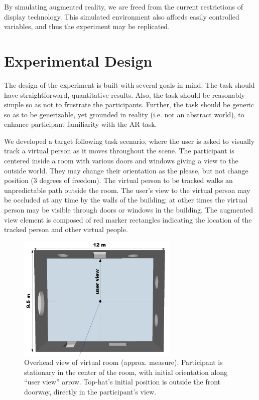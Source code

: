 \documentclass{acmsiggraph}                     %
\begin{document}
By simulating augmented reality, we are freed from the current restrictions of display technology.  This simulated environment also affords easily controlled variables, and thus the experiment may be replicated.

\section{Experimental Design}

The design of the experiment is built with several goals in mind.  The task should have straightforward, quantitative results.  Also, the task should be reasonably simple so as not to frustrate the participants.  Further, the task should be generic so as to be generizable, yet grounded in reality (i.e. not an abstract world), to enhance participant familiarity with the AR task.

We developed a target following task scenario, where the user is asked to visually track a virtual person as it moves throughout the scene.  The participant is centered inside a room with various doors and windows giving a view to the outside world.  They may change their orientation as the please, but not change position (3 degrees of freedom).  The virtual person to be tracked walks an unpredictable path outside the room.  The user's view to the virtual person may be occluded at any time by the walls of the building; at other times the virtual person may be visible through doors or windows in the building.  The augmented view element is composed of red marker rectangles indicating the location of the tracked person and other virtual people.

\begin{figure}[t]
	\centering
	\includegraphics[width=3in]{figures/augmentedroom.png}
	\caption{Overhead view of virtual room (approx. measure).  Participant is stationary in the center of the room, with initial orientation along ``user view'' arrow.  Top-hat's initial position is outside the front doorway, directly in the participant's view.}
\end{figure}
\end{document}

